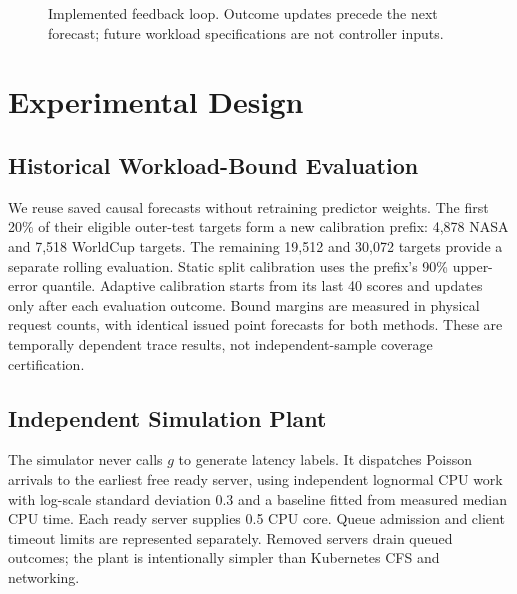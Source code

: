 \documentclass[11pt,a4paper]{article}
\begin{document}
\begin{figure}[htbp]\centering
{}
\caption{Implemented feedback loop. Outcome updates precede the next forecast; future workload specifications are not controller inputs.}\label{fig:architecture}\end{figure}

\section{Experimental Design}
\subsection{Historical Workload-Bound Evaluation}
We reuse saved causal forecasts without retraining predictor weights. The first 20\% of their eligible outer-test targets form a new calibration prefix: 4,878 NASA and 7,518 WorldCup targets. The remaining 19,512 and 30,072 targets provide a separate rolling evaluation. Static split calibration uses the prefix's 90\% upper-error quantile. Adaptive calibration starts from its last 40 scores and updates only after each evaluation outcome. Bound margins are measured in physical request counts, with identical issued point forecasts for both methods. These are temporally dependent trace results, not independent-sample coverage certification.

\subsection{Independent Simulation Plant}
The simulator never calls $g$ to generate latency labels. It dispatches Poisson arrivals to the earliest free ready server, using independent lognormal CPU work with log-scale standard deviation 0.3 and a baseline fitted from measured median CPU time. Each ready server supplies 0.5 CPU core. Queue admission and client timeout limits are represented separately. Removed servers drain queued outcomes; the plant is intentionally simpler than Kubernetes CFS and networking.
\end{document}
